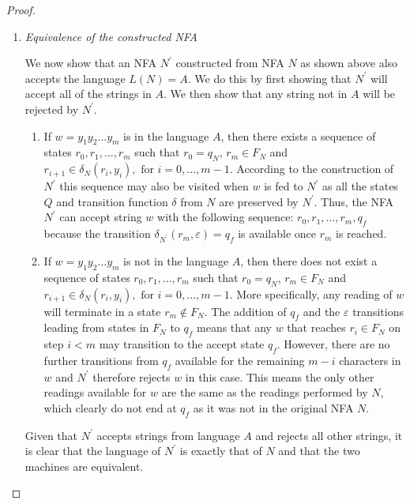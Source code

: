 \documentclass[10pt]{article}
\theoremstyle{definition}
\begin{document}
\begin{proof}
\begin{enumerate}
\item \textit{Equivalence of the constructed NFA}

We now show that an NFA $N^\prime$ constructed from NFA $N$ as shown above also accepts the language $L(N)=A$. We do this by first showing that $N^\prime$ will accept all of the strings in $A$. We then show that any string not in $A$ will be rejected by $N^\prime$.

\begin{enumerate}[label=\textbf{\roman*.} ]
 \item If $w = y_1y_2 \ldots y_m$ is in the language $A$, then there exists a sequence of states $r_0,r_1,\ldots,r_m$ such that $r_0 = q_N$, $r_m \in F_N$ and $r_{i+1} \in \delta_N(r_i,y_i),\mbox{ for } i=0,\ldots,m-1$. According to the construction of $N^\prime$ this sequence may also be visited when $w$ is fed to $N^\prime$ as all the states $Q$ and transition function $\delta$ from $N$ are preserved by $N^{\prime}$. Thus, the NFA $N^\prime$ can accept string $w$ with the following sequence: $r_0,r_1, \ldots, r_m , q_f$ because the transition $\delta_{N^\prime}(r_m,\varepsilon) = q_f$ is available once $r_m$ is reached.

\item If $w = y_1y_2 \ldots y_m$ is not in the language $A$, then there does not exist a sequence of states $r_0,r_1,\ldots,r_m$ such that $r_0 = q_N$, $r_m \in F_N$ and $r_{i+1} \in \delta_N(r_i,y_i),\mbox{ for } i=0,\ldots,m-1$. More specifically, any reading of $w$ will terminate in a state $r_m \not\in F_N$. The addition of $q_f$ and the $\varepsilon$ transitions leading from states in $F_N$ to $q_f$ means that any $w$ that reaches $r_i \in F_N$ on step $i < m$ may transition to the accept state $q_f$. However, there are no further transitions from $q_f$ available for the remaining $m-i$ characters in $w$ and $N^\prime$ therefore rejects $w$ in this case. This means the only other readings available for $w$ are the same as the readings performed by $N$, which clearly do not end at $q_f$ as it was not in the original NFA $N$\@.

\end{enumerate}

Given that $N^\prime$ accepts strings from language $A$ and rejects all other strings, it is clear that the language of $N^\prime$ is exactly that of $N$ and that the two machines are equivalent.
\end{enumerate}

\end{proof}
\end{document}
